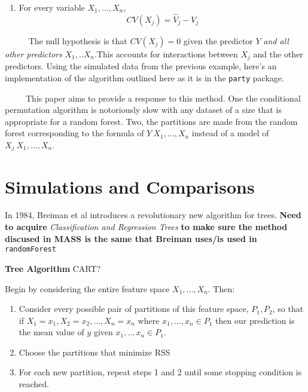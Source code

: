 \documentclass[12pt,twoside]{reedthesis}
\providecommand{\tightlist}{%
  \setlength{\itemsep}{0pt}\setlength{\parskip}{0pt}}
\begin{document}
  \begin{enumerate}
  \def\labelenumi{\arabic{enumi}.}
  \setcounter{enumi}{2}
  \tightlist
  \item
    For every variable \(X_1,..., X_n\), \[CV(X_j) = \hat{V}_j - V_j\]
  \end{enumerate}
  
  ~~~~~ The null hypothesis is that \(CV(X_j) = 0\) given the predictor
  \(Y\) \emph{and all other predictors} \(X_1,..X_n\).This accounts for
  interactions between \(X_j\) and the other predictors. Using the
  simulated data from the previous example, here's an implementation of
  the algorithm outlined here as it is in the \texttt{party} package.
  
  ~~~~~This paper aims to provide a response to this method. One the
  conditional permutation algorithm is notoriously slow with any dataset
  of a size that is appropriate for a random forest. Two, the partitions
  are made from the random forest corresponding to the formula of
  \(Y~X_1,...,X_n\) instead of a model of \(X_j~X_1,...,X_n\).
  
  \chapter{Simulations and Comparisons}\label{simulations-and-comparisons}
  
  In 1984, Breiman et al introduces a revolutionary new algorithm for
  trees. \textbf{Need to acquire} \emph{Classification and Regression
  Trees} \textbf{to make sure the method discused in MASS is the same that
  Breiman uses/is used in} \texttt{randomForest}
  
  \textbf{Tree Algorithm} CART?
  
  Begin by considering the entire feature space \(X_1, ..., X_n\). Then:
  
  \begin{enumerate}
  \def\labelenumi{\arabic{enumi}.}
  \item
    Consider every possible pair of partitions of this feature space,
    \(P_1, P_2\), so that if \(X_1 = x_1 , X_2 = x_2,..., X_n = x_n\)
    where \({x_1,...,x_n} \in P_1\) then our prediction is the mean value
    of \(y\) given \(x_1,..,x_n \in P_1\).
  \item
    Choose the partitions that minimize RSS
  \item
    For each new partition, repeat steps 1 and 2 until some stopping
    condition is reached.
  \end{enumerate}
  
\end{document}
